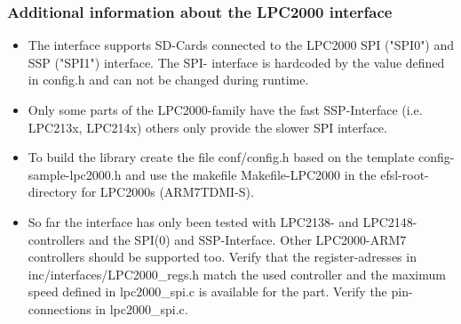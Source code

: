 \subsubsection{Additional information about the LPC2000 interface}
	\begin{itemize}

\item The interface supports SD-Cards
connected to the LPC2000 SPI ("SPI0") 
and SSP ("SPI1") interface. The SPI-
interface is hardcoded by the value 
defined in config.h and can not be 
changed during runtime.

\item Only some parts of the LPC2000-family
have the fast SSP-Interface (i.e. LPC213x,
LPC214x) others only provide the slower 
SPI interface.

\item To build the library create the file 
conf/config.h based on the template 
config-sample-lpc2000.h and use the 
makefile Makefile-LPC2000 in the
efsl-root-directory for LPC2000s 
(ARM7TDMI-S).

\item So far the interface has only been
tested with LPC2138- and LPC2148-controllers
and the SPI(0) and SSP-Interface.
Other LPC2000-ARM7 controllers 
should be supported too. Verify
that the register-adresses in 
inc/interfaces/LPC2000\_regs.h
match the used controller and the
maximum speed defined in lpc2000\_spi.c
is available for the part.
Verify the pin-connections in lpc2000\_spi.c.
	\end{itemize}


